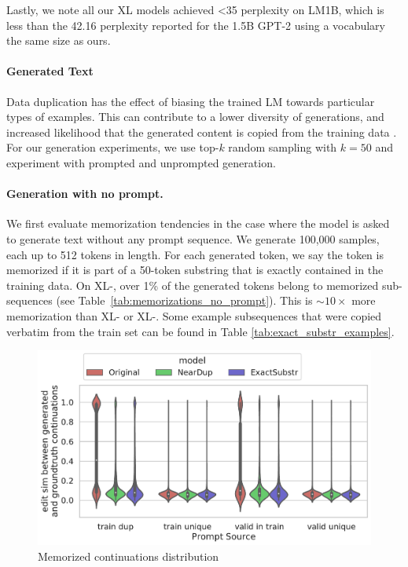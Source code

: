Lastly, we note all our XL models achieved  <35 perplexity on LM1B, which is less than the 42.16 perplexity reported for the 1.5B GPT-2 using a vocabulary the same size as ours.


\paragraph{Generated Text}\label{sec:memorization-results}
Data duplication has the effect of biasing the trained LM towards particular types of examples. 
This can contribute to a lower diversity of generations, and increased likelihood that the generated content is copied from the training data \citep{carlini2020extracting}.
For our generation experiments, we use top-$k$ random sampling with $k=50$ and experiment with prompted and unprompted generation.


\paragraph{Generation with no prompt.}
We first evaluate memorization tendencies in the case where the model is asked to generate text without any prompt sequence.
We generate 100,000 samples, each up to 512 tokens in length.
For each generated token, we say the token is memorized if it is part of a 50-token substring that is exactly contained in the training data.
On XL-\Original, over 1\% of the generated tokens belong to memorized sub-sequences (see Table~\ref{tab:memorizations_no_prompt}).
This is $\sim10\times$ more memorization than XL-\Exact{} or XL-\Approx.
Some example subsequences that were copied verbatim from the train set can be found in Table \ref{tab:exact_substr_examples}.



\begin{figure}
    \centering
    \includegraphics[width=\linewidth]{figures/memorized_continuations_distribution.pdf}
    \caption{Memorized continuations distribution}
    \label{fig:mem-cont-dist}
\end{figure}

